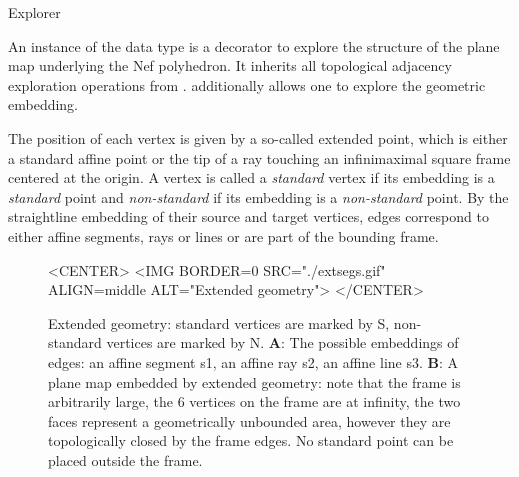 
\begin{ccRefClass}{Explorer}

\ccDefinition

An instance  of the data type  is a decorator to
explore the structure of the plane map underlying the Nef
polyhedron. It inherits all topological adjacency exploration
operations from . 
additionally allows one to explore the geometric embedding.

The position of each vertex is given by a so-called extended point,
which is either a standard affine point or the tip of a ray touching
an infinimaximal square frame centered at the origin. A vertex 
is called a \emph{standard} vertex if its embedding is a
\emph{standard} point and \emph{non-standard} if its embedding is a
\emph{non-standard} point. By the straightline embedding of their
source and target vertices, edges correspond to either affine
segments, rays or lines or are part of the bounding frame.

\begin{figure}[htbp]
\begin{ccTexOnly}
\begin{center}
\end{center}
\end{ccTexOnly}
\caption{Extended geometry: standard vertices are marked
by S, non-standard vertices are marked by N. \textbf{A}: The possible
embeddings of edges: an affine segment s1, an affine ray s2, an affine
line s3. \textbf{B}: A plane map embedded by extended geometry: note
that the frame is arbitrarily large, the 6 vertices on the frame are
at infinity, the two faces represent a geometrically unbounded area,
however they are topologically closed by the frame edges. No standard
point can be placed outside the frame.}\label{extsegs}
\begin{ccHtmlOnly}
<CENTER>
<IMG BORDER=0 SRC="./extsegs.gif" ALIGN=middle
ALT="Extended geometry">
</CENTER>
\end{ccHtmlOnly}
\end{figure}      


\end{ccRefClass}
